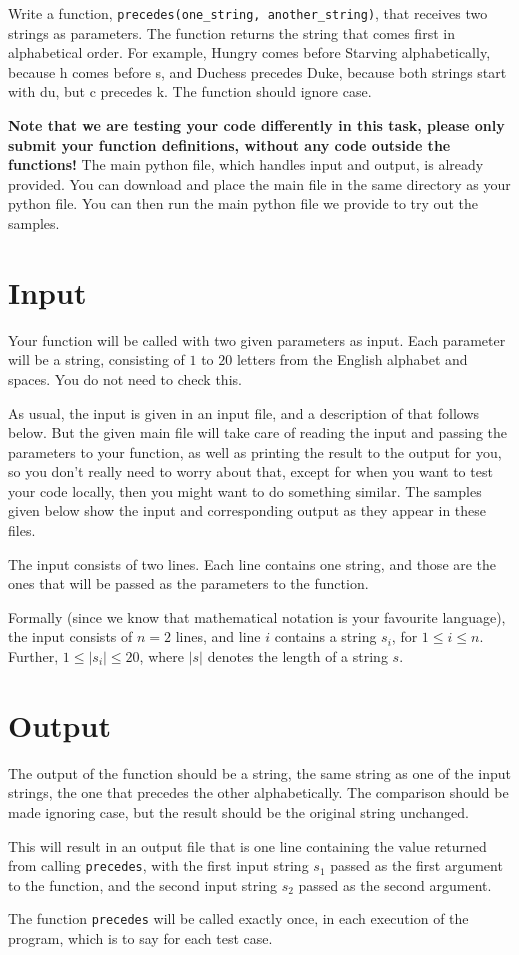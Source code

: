 
Write a function, \texttt{precedes(one\_string, another\_string)}, that receives two strings as parameters.
The function returns the string that comes first in alphabetical order.
For example, Hungry comes before Starving alphabetically, because h comes before s,
and Duchess precedes Duke, because both strings start with du, but c precedes k.
The function should ignore case.

\textbf{Note that we are testing your code differently in this task,
please only submit your function definitions, without any code outside the functions!}
The main python file, which handles input and output, is already provided.
You can download and place the main file in the same directory as your python file.
You can then run the main python file we provide to try out the samples.

\section*{Input}
Your function will be called with two given parameters as input.
Each parameter will be a string, consisting of $1$ to $20$ letters from the English alphabet and spaces.
You do not need to check this.

As usual, the input is given in an input file, and a description of that follows below.
But the given main file will take care of reading the input and passing the parameters to your function,
as well as printing the result to the output for you, so you don't really need to worry about that,
except for when you want to test your code locally, then you might want to do something similar.
The samples given below show the input and corresponding output as they appear in these files.

The input consists of two lines.
Each line contains one string,
and those are the ones that will be passed as the parameters to the function.

Formally (since we know that mathematical notation is your favourite language),
the input consists of $n = 2$ lines,
and line $i$ contains a string $s_i$, for $1 \le i \le n$.
Further, $1 \le |s_i| \le 20$, where $|s|$ denotes the length of a string $s$.

\section*{Output}
The output of the function should be a string, the same string as one of the input strings,
the one that precedes the other alphabetically.
The comparison should be made ignoring case,
but the result should be the original string unchanged.

This will result in an output file that is one line containing the value returned from calling \texttt{precedes},
with the first input string $s_1$ passed as the first argument to the function,
and the second input string $s_2$ passed as the second argument.

The function \texttt{precedes} will be called exactly once,
in each execution of the program, which is to say for each test case.
